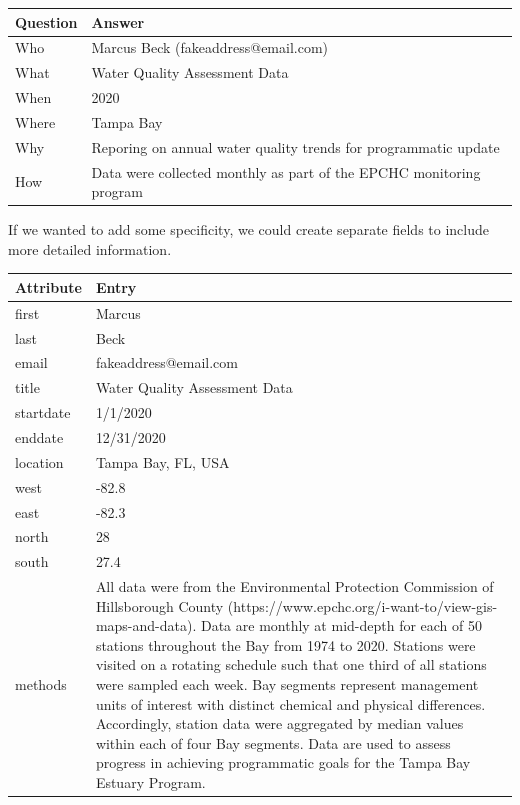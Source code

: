 \documentclass[
]{book}
\begin{document}
\begin{tabular}{l|l}
\hline
Question & Answer\\
\hline
Who & Marcus Beck (fakeaddress@email.com)\\
\hline
What & Water Quality Assessment Data\\
\hline
When & 2020\\
\hline
Where & Tampa Bay\\
\hline
Why & Reporing on annual water quality trends for programmatic update\\
\hline
How & Data were collected monthly as part of the EPCHC monitoring program\\
\hline
\end{tabular}

If we wanted to add some specificity, we could create separate fields to include more detailed information.

\begin{tabular}{l|l}
\hline
Attribute & Entry\\
\hline
first & Marcus\\
\hline
last & Beck\\
\hline
email & fakeaddress@email.com\\
\hline
title & Water Quality Assessment Data\\
\hline
startdate & 1/1/2020\\
\hline
enddate & 12/31/2020\\
\hline
location & Tampa Bay, FL, USA\\
\hline
west & -82.8\\
\hline
east & -82.3\\
\hline
north & 28\\
\hline
south & 27.4\\
\hline
methods & All data were from the Environmental Protection Commission of Hillsborough County (https://www.epchc.org/i-want-to/view-gis-maps-and-data). Data are monthly at mid-depth for each of 50 stations throughout the Bay from 1974 to 2020. Stations were visited on a rotating schedule such that one third of all stations were sampled each week. Bay segments represent management units of interest with distinct chemical and physical differences. Accordingly, station data were aggregated by median values within each of four Bay segments. Data are used to assess progress in achieving programmatic goals for the Tampa Bay Estuary Program.\\
\hline
\end{tabular}
\end{document}

